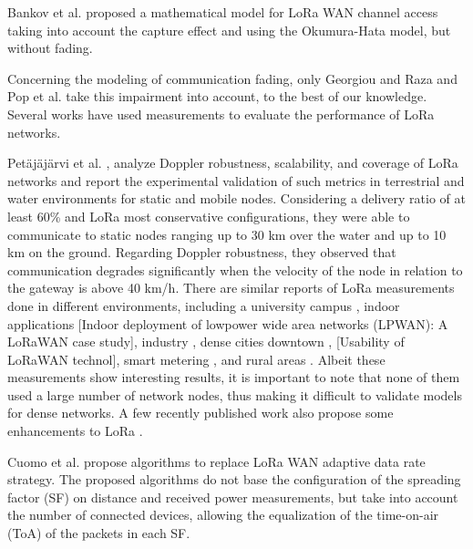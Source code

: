 Bankov et al.
\cite{bankov_mathematical_2017} proposed a mathematical model for LoRa WAN channel access taking into account the capture effect and using the Okumura-Hata model,
	but without fading.

Concerning the modeling of communication fading,
	only Georgiou and Raza \cite{georgiou_low_2017} and Pop et al.
\cite{pop_does_2017} take this impairment into account,
	to the best of our knowledge.
Several works have used measurements to evaluate the performance of LoRa networks.

Petäjäjärvi et al.
\cite{petajajarvi_performance_2017},
	\cite{petajajarvi_evaluation_2017} analyze Doppler robustness,
	scalability,
	and coverage of LoRa networks and report the experimental validation of such metrics in terrestrial and water environments for static and mobile nodes.
Considering a delivery ratio of at least 60\% and
LoRa most conservative configurations,
	they were able to communicate to static nodes ranging up to 30 km over the water and up to 10 km on the ground.
Regarding Doppler robustness,
	they observed that communication degrades significantly when the velocity of the node in relation to the gateway is above 40 km/h.
There are similar reports of LoRa measurements done in different environments,
	including a university campus \cite{wang_performance_2017},
	indoor applications [Indoor deployment of lowpower wide area networks (LPWAN):
	A LoRaWAN case study],
	industry \cite{angrisani_lora_2017},
	dense cities downtown \cite{jorke_urban_2017},
	[Usability of LoRaWAN technol],
	smart metering \cite{rizzi_evaluation_2017},
	and rural areas \cite{oliveira_long_2017}.
Albeit these measurements show interesting results,
	it is important to note that none of them used a large number of network nodes,
	thus making it difficult to validate models for dense networks.
A few recently published work also propose some enhancements to LoRa .

Cuomo et al.
\cite{cuomo_explora_2017} propose algorithms to replace LoRa WAN adaptive data rate strategy.
The proposed algorithms do not base the configuration of the spreading factor (SF) on distance and received power measurements,
	but take into account the number of connected devices,
	allowing the equalization of the time-on-air (ToA) of the packets in each SF.

